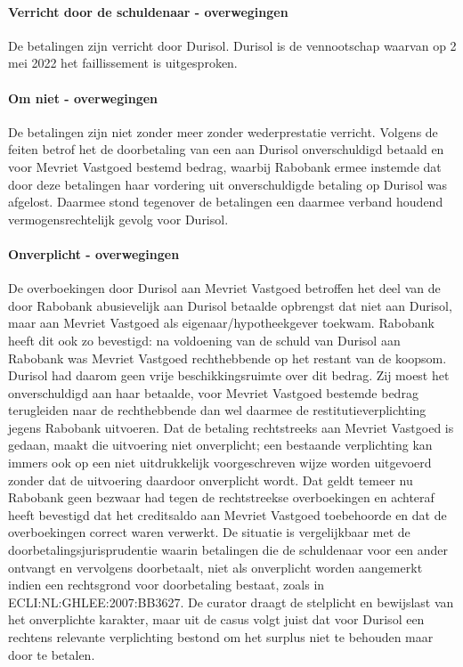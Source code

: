 \documentclass[
  dutch,
  a4paper,
]{article}
\begin{document}
\paragraph{Verricht door de schuldenaar - overwegingen}\label{verricht-door-de-schuldenaar---overwegingen-16}

De betalingen zijn verricht door Durisol. Durisol is de vennootschap waarvan op 2 mei 2022 het faillissement is uitgesproken.

\paragraph{Om niet - overwegingen}\label{om-niet---overwegingen-16}

De betalingen zijn niet zonder meer zonder wederprestatie verricht. Volgens de feiten betrof het de doorbetaling van een aan Durisol onverschuldigd betaald en voor Mevriet Vastgoed bestemd bedrag, waarbij Rabobank ermee instemde dat door deze betalingen haar vordering uit onverschuldigde betaling op Durisol was afgelost. Daarmee stond tegenover de betalingen een daarmee verband houdend vermogensrechtelijk gevolg voor Durisol.

\paragraph{Onverplicht - overwegingen}\label{onverplicht---overwegingen-16}

De overboekingen door Durisol aan Mevriet Vastgoed betroffen het deel van de door Rabobank abusievelijk aan Durisol betaalde opbrengst dat niet aan Durisol, maar aan Mevriet Vastgoed als eigenaar/hypotheekgever toekwam. Rabobank heeft dit ook zo bevestigd: na voldoening van de schuld van Durisol aan Rabobank was Mevriet Vastgoed rechthebbende op het restant van de koopsom. Durisol had daarom geen vrije beschikkingsruimte over dit bedrag. Zij moest het onverschuldigd aan haar betaalde, voor Mevriet Vastgoed bestemde bedrag terugleiden naar de rechthebbende dan wel daarmee de restitutieverplichting jegens Rabobank uitvoeren. Dat de betaling rechtstreeks aan Mevriet Vastgoed is gedaan, maakt die uitvoering niet onverplicht; een bestaande verplichting kan immers ook op een niet uitdrukkelijk voorgeschreven wijze worden uitgevoerd zonder dat de uitvoering daardoor onverplicht wordt. Dat geldt temeer nu Rabobank geen bezwaar had tegen de rechtstreekse overboekingen en achteraf heeft bevestigd dat het creditsaldo aan Mevriet Vastgoed toebehoorde en dat de overboekingen correct waren verwerkt. De situatie is vergelijkbaar met de doorbetalingsjurisprudentie waarin betalingen die de schuldenaar voor een ander ontvangt en vervolgens doorbetaalt, niet als onverplicht worden aangemerkt indien een rechtsgrond voor doorbetaling bestaat, zoals in ECLI:NL:GHLEE:2007:BB3627. De curator draagt de stelplicht en bewijslast van het onverplichte karakter, maar uit de casus volgt juist dat voor Durisol een rechtens relevante verplichting bestond om het surplus niet te behouden maar door te betalen.
\end{document}
